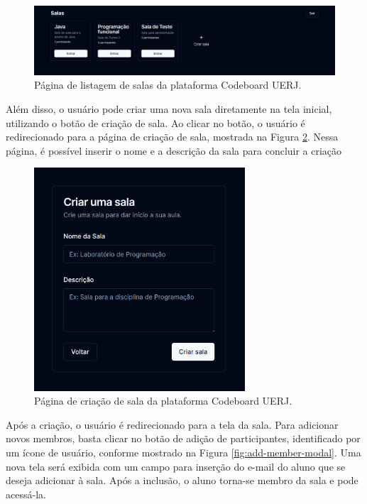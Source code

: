 \begin{figure}[H]
    \centering
    \includegraphics[width=1\textwidth]{assets/codeboard/rooms-page.png}
    \caption{Página de listagem de salas da plataforma Codeboard UERJ.}
    \label{fig:rooms-page}
\end{figure}


Além disso, o usuário pode criar uma nova sala diretamente na tela inicial, utilizando o botão de criação de sala. Ao clicar no botão, o usuário é redirecionado para a página de criação de sala, mostrada na Figura \ref{fig:create-room-page}. Nessa página, é possível inserir o nome e a descrição da sala para concluir a criação

\begin{figure}[H]
    \centering
    \includegraphics[width=0.7\textwidth]{assets/codeboard/create-room-page.png}
    \caption{Página de criação de sala da plataforma Codeboard UERJ.}
    \label{fig:create-room-page}
\end{figure}

Após a criação, o usuário é redirecionado para a tela da sala. Para adicionar novos membros, basta clicar no botão de adição de participantes, identificado por um ícone de usuário, conforme mostrado na Figura \ref{fig:add-member-modal}. Uma nova tela será exibida com um campo para inserção do e-mail do aluno que se deseja adicionar à sala. Após a inclusão, o aluno torna-se membro da sala e pode acessá-la.

